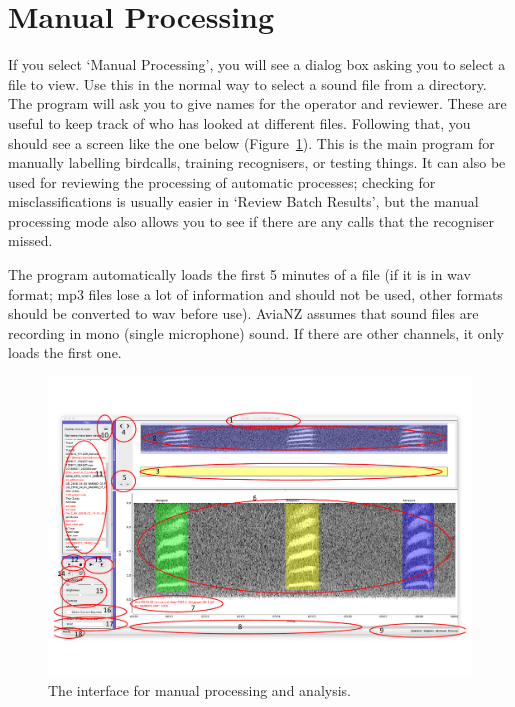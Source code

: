 \documentclass{article}
\begin{document}
\section{Manual Processing}
\label{sec:manual}

If you select `Manual Processing', you will see a dialog box asking you to select a file to view. Use this in the normal way to select a sound file from a directory. The program will ask you to give names for the operator and reviewer. These are useful to keep track of who has looked at different files. Following that, you should see a screen like the one below (Figure~\ref{main}). This is the main program for manually labelling birdcalls, training recognisers, or testing things. It can also be used for reviewing the processing of automatic processes; checking for misclassifications is usually easier in `Review Batch Results', but the manual processing mode also allows you to see if there are any calls that the recogniser missed. 

The program automatically loads the first 5 minutes of a file (if it is in wav format; mp3 files lose a lot of information and should not be used, other formats should be converted to wav before use). AviaNZ assumes that sound files are recording in mono (single microphone) sound. If there are other channels, it only loads the first one.

\begin{figure}[h!]
\centering
\includegraphics[width=.8\textwidth]{Figs/AviaNZInterface.pdf}
\caption{The interface for manual processing and analysis.}
\label{main}
\end{figure}
\end{document}
